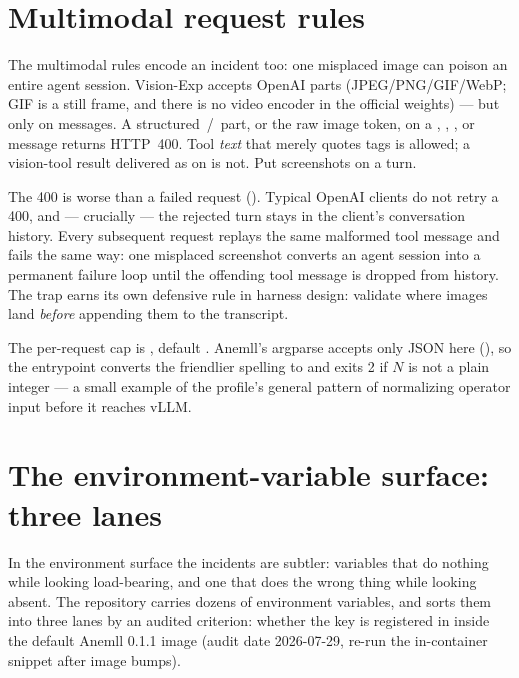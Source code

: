 \section{Multimodal request rules}
\label{sec:profile-multimodal}

The multimodal rules encode an incident too: one misplaced image can poison
an entire agent session. Vision-Exp accepts OpenAI  parts
(JPEG/PNG/GIF/WebP; GIF is a still frame, and there is no video encoder in
the official weights) --- but only on  messages. A structured \,/\,
part, or the raw image token, on a , ,
, or  message returns HTTP~400. Tool \emph{text}
that merely quotes  tags is allowed; a vision-tool result
delivered as  on  is not. Put screenshots
on a  turn.

\begin{hbwarstory}
The 400 is worse than a failed request (). Typical OpenAI
clients do not retry a 400, and --- crucially --- the rejected turn stays in
the client's conversation history. Every subsequent request replays the same
malformed tool message and fails the same way: one misplaced screenshot
converts an agent session into a permanent failure loop until the offending
tool message is dropped from history. The trap earns its own defensive rule
in harness design: validate where images land \emph{before} appending them to
the transcript.
\end{hbwarstory}

The per-request cap is , default
. Anemll's argparse accepts only JSON here
(), so the entrypoint converts the friendlier
 spelling to  and exits 2 if $N$ is not a
plain integer --- a small example of the profile's general pattern of
normalizing operator input before it reaches vLLM.

\section{The environment-variable surface: three lanes}
\label{sec:profile-envs}

In the environment surface the incidents are subtler: variables that do
nothing while looking load-bearing, and one that does the wrong thing while
looking absent. The repository carries dozens of environment variables, and
 sorts them into three lanes by an audited criterion:
whether the key is registered in 
inside the default Anemll 0.1.1 image (audit date 2026-07-29, re-run the
in-container snippet after image bumps).

